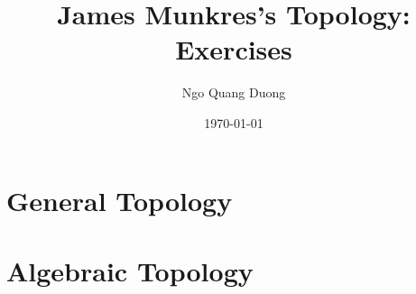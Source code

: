 \documentclass{james-munkres-topology}
\title{James Munkres's Topology: Exercises}
\author{Ngo Quang Duong}
\date{\today}
\begin{document}
\maketitle

\tableofcontents

\part{General Topology}










\part{Algebraic Topology}







\end{document}
